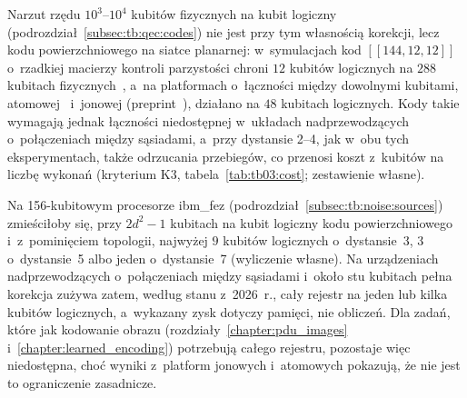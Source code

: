 Narzut rzędu $10^3$--$10^4$ kubitów fizycznych na kubit logiczny (podrozdział~\ref{subsec:tb:qec:codes}) nie jest przy tym własnością korekcji, lecz kodu powierzchniowego na siatce planarnej: w~symulacjach kod $[[144,12,12]]$ o~rzadkiej macierzy kontroli parzystości chroni $12$ kubitów logicznych na $288$ kubitach fizycznych~\cite{bravyi_high-threshold_2024}, a~na platformach o~łączności między dowolnymi kubitami, atomowej~\cite{bluvstein_logical_2024} i~jonowej (preprint~\cite{dasu_computing_2026}), działano na $48$ kubitach logicznych.
Kody takie wymagają jednak łączności niedostępnej w~układach nadprzewodzących o~połączeniach między sąsiadami, a~przy dystansie 2--4, jak w~obu tych eksperymentach, także odrzucania przebiegów, co przenosi koszt z~kubitów na liczbę wykonań (kryterium K3, tabela~\ref{tab:tb03:cost}; zestawienie własne).

Na 156-kubitowym procesorze ibm\_fez (podrozdział~\ref{subsec:tb:noise:sources}) zmieściłoby się, przy $2d^2-1$ kubitach na kubit logiczny kodu powierzchniowego~\cite{google_quantum_2025} i~z~pominięciem topologii, najwyżej $9$ kubitów logicznych o~dystansie~3, $3$ o~dystansie~5 albo jeden o~dystansie~7 (wyliczenie własne).
Na urządzeniach nadprzewodzących o~połączeniach między sąsiadami i~około stu kubitach pełna korekcja zużywa zatem, według stanu z~2026~r., cały rejestr na jeden lub kilka kubitów logicznych, a~wykazany zysk dotyczy pamięci, nie obliczeń.
Dla zadań, które jak kodowanie obrazu (rozdziały~\ref{chapter:pdu_images} i~\ref{chapter:learned_encoding}) potrzebują całego rejestru, pozostaje więc niedostępna, choć wyniki z~platform jonowych i~atomowych pokazują, że nie jest to ograniczenie zasadnicze.

